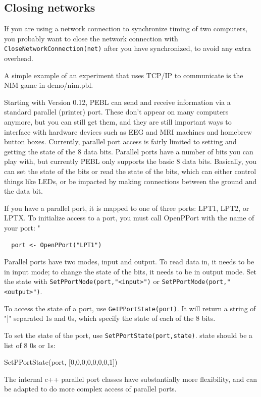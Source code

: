 \subsection{Closing networks}
If you are using a network connection to synchronize timing of two
computers, you probably want to close the network connection with\\
\texttt{CloseNetworkConnection(net)} after you have synchronized, to
avoid any extra overhead.

A simple example of an experiment that uses TCP/IP to communicate is
the NIM game in  demo/nim.pbl.



Starting with Version 0.12, PEBL can send and receive information via a standard parallel (printer) port.    These don't appear on many computers anymore, but you can still get them, and they are still important ways to interface with hardware devices such as EEG and MRI machines and homebrew button boxes.  Currently, parallel port access is fairly limited to setting and getting the state of the 8 data bits.  Parallel ports have a number of bits you can play with, but currently PEBL only supports the basic 8 data bits.  Basically, you can set the state of the bits or read the state of the bits, which can either control things like LEDs, or be impacted by making connections between the ground and the data bit.


If you have a parallel port, it is mapped to one of three ports: LPT1, LPT2, or LPTX.  To initialize access to a port, you must call OpenPPort with the name of your port:
"
\begin{verbatim}
  port <- OpenPPort("LPT1")
\end{verbatim}

Parallel ports have two modes, input and output.  To read data in, it needs to be in input mode; to change the state of the bits, it needs to be in output mode.  Set the state with \texttt{SetPPortMode(port,"<input>")} or \texttt{SetPPortMode(port,"<output>")}.

To access the state of a port, use \texttt{GetPPortState(port)}.  It will return a string of "|" separated 1s and 0s, which specify the state of each of the 8 bits.

To set the state of the port, use \texttt{SetPPortState(port,state)}.  state should be a list of 8 0s or 1s:

SetPPortState(port, [0,0,0,0,0,0,0,1])

The internal c++ parallel port classes have substantially more flexibility, and can be adapted to do more complex access of parallel ports.




